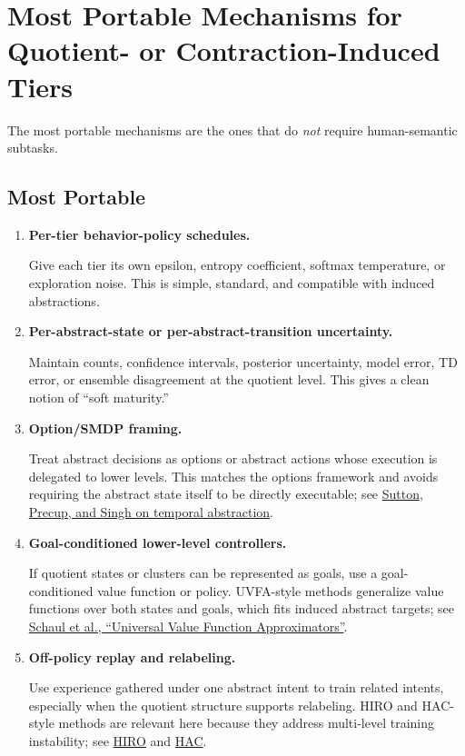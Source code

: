 \documentclass[11pt]{article}
\begin{document}
\section{Most Portable Mechanisms for Quotient- or Contraction-Induced Tiers}

The most portable mechanisms are the ones that do \emph{not} require
human-semantic subtasks.

\subsection{Most Portable}

\begin{enumerate}[label=\arabic*.]
    \item \textbf{Per-tier behavior-policy schedules.}

    Give each tier its own epsilon, entropy coefficient, softmax temperature,
    or exploration noise. This is simple, standard, and compatible with
    induced abstractions.

    \item \textbf{Per-abstract-state or per-abstract-transition uncertainty.}

    Maintain counts, confidence intervals, posterior uncertainty, model error,
    TD error, or ensemble disagreement at the quotient level. This gives a
    clean notion of ``soft maturity.''

    \item \textbf{Option/SMDP framing.}

    Treat abstract decisions as options or abstract actions whose execution is
    delegated to lower levels. This matches the options framework and avoids
    requiring the abstract state itself to be directly executable; see
    \href{https://www.sciencedirect.com/science/article/pii/S0004370299000521}
    {Sutton, Precup, and Singh on temporal abstraction}.

    \item \textbf{Goal-conditioned lower-level controllers.}

    If quotient states or clusters can be represented as goals, use a
    goal-conditioned value function or policy. UVFA-style methods generalize
    value functions over both states and goals, which fits induced abstract
    targets; see
    \href{https://proceedings.mlr.press/v37/schaul15.pdf}
    {Schaul et al., ``Universal Value Function Approximators''}.

    \item \textbf{Off-policy replay and relabeling.}

    Use experience gathered under one abstract intent to train related intents,
    especially when the quotient structure supports relabeling. HIRO and
    HAC-style methods are relevant here because they address multi-level
    training instability; see
    \href{https://arxiv.org/abs/1805.08296}
    {HIRO}
    and
    \href{https://arxiv.org/abs/1712.00948}
    {HAC}.
\end{enumerate}
\end{document}
